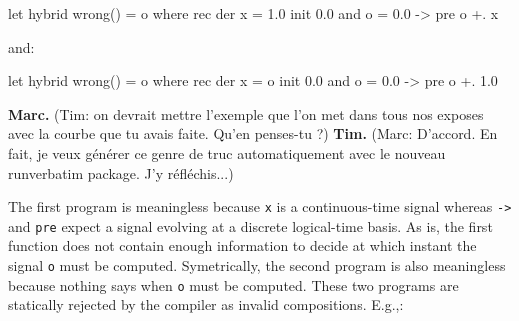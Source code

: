 \documentclass[11pt,titlepage,twoside]{report}
\newcommand{\Marc}[1]{{\bf Marc.} ({#1})}
\newcommand{\Tim}[1]{{\bf Tim.} ({#1})}
\begin{document}
\begin{runverbatim}[fail]
let hybrid wrong() = o where
  rec der x = 1.0 init 0.0
  and o = 0.0 -> pre o +. x
\end{runverbatim}
and:
\begin{runverbatim}[fail]
let hybrid wrong() = o where
  rec der x = o init 0.0
  and o = 0.0 -> pre o +. 1.0
\end{runverbatim}

\Marc{Tim: on devrait mettre l'exemple que l'on met dans tous nos exposes
avec la courbe que tu avais faite. Qu'en penses-tu ?}
\Tim{Marc: D'accord. En fait, je veux générer ce genre de truc 
automatiquement avec le nouveau runverbatim package. J'y réfléchis...}

The first program is meaningless because \texttt{x} is a
continuous-time signal whereas \texttt{->} and \texttt{pre} expect a
signal evolving at a discrete logical-time basis. As is, the first
function does not contain enough information to decide at which instant
the signal \texttt{o} must be computed. Symetrically, the second
program is also meaningless because nothing says when \texttt{o} must
be computed. These two programs are statically rejected by the compiler
as invalid compositions. E.g.,:
\runverbatimerr
\end{document}
